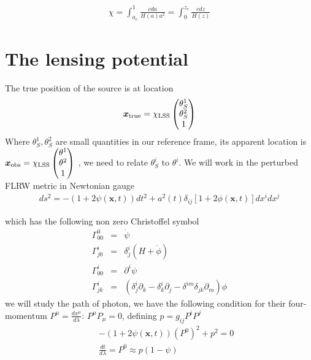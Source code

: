 \documentclass[a4paper, 11pt]{article}
\def\ba{\begin{eqnarray}}
\def\ea{\end{eqnarray}}
\begin{document}
\ba
\chi  = \int_{a_{e}}^{1}  \frac{c da}{ H(a) a^{2}} = \int^{z_{e}}_{0}  \frac{c dz}{ H(z)}
\ea



\section{The lensing potential}

The true position of the source is at location 
\ba
\bm{x}_{\rm true}  =\chi_{\rm LSS} \begin{pmatrix} 
{\theta}^{1}_{S} \cr
{\theta}^{2}_{S} \cr
 1
 \end{pmatrix} 
\ea
Where $\theta^{1}_{S}, \theta^{2}_{S}$ are small quantities in our reference frame, its apparent location is $\bm{x}_{\rm obs} = \chi_{\rm LSS}  \begin{pmatrix} 
{\theta}^{1} \cr
{\theta}^{2} \cr
 1
 \end{pmatrix} $
 , we need to relate ${\theta}^{i}_{S}$  to ${\theta}^{i}$. 
We will work in the perturbed FLRW metric in Newtonian gauge
\ba
ds^{2} = -(1 + 2\psi(\bm{x},t))dt^{2} + a^{2}(t)\delta_{ij}[1+2\phi(\bm{x},t)]dx^{i}dx^{j}
\ea


which has the following non zero Christoffel symbol
\ba
\Gamma^{0}_{00} &=& \dot{\psi} \\
\Gamma^{i}_{j0}  &=& \delta^{i}_{j} (H +\dot{\phi}) \\
\Gamma^{i}_{00}  &=& \partial^{i} \psi \\
\Gamma^{i}_{jk} &=&   (\delta^{i}_{j} \partial_{k} - \delta^{i}_{k} \partial_{j}  - \delta^{im}\delta_{jk} \partial_{m} ) \phi
\ea
we will study the path of photon, we have the following condition for their four-momentum $P^{\mu} = \frac{dx^{\mu}}{d\lambda}$: $P^{\mu}P_{\mu} = 0$, defining $p = g_{ij}P^{i}P^{j}$
\ba
 &&-(1 + 2\psi(\bm{x},t))(P^{0})^{2} + p^{2} = 0 \\
 &&\frac{dt}{d\lambda}  = P^{0} \approx p(1-\psi) \\
\ea
\end{document}
